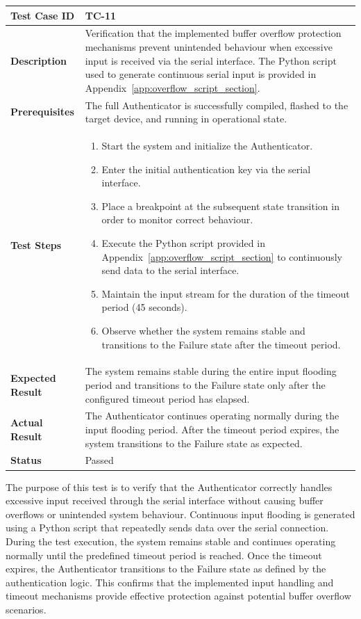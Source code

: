 \begin{table}[H]
\centering
\begin{tabular}{|p{}|p{}|}
\hline
\textbf{Test Case ID} & TC-11 \\ \hline
\textbf{Description} & Verification that the implemented buffer overflow protection mechanisms prevent unintended behaviour when excessive input is received via the serial interface. The Python script used to generate continuous serial input is provided in Appendix~\ref{app:overflow_script_section}. \\ \hline
\textbf{Prerequisites} & The full Authenticator is successfully compiled, flashed to the target device, and running in operational state. \\ \hline
\textbf{Test Steps} &
\begin{enumerate}
\item Start the system and initialize the Authenticator.
\item Enter the initial authentication key via the serial interface.
\item Place a breakpoint at the subsequent state transition in order to monitor correct behaviour.
\item Execute the Python script provided in Appendix~\ref{app:overflow_script_section} to continuously send data to the serial interface.
\item Maintain the input stream for the duration of the timeout period (45 seconds).
\item Observe whether the system remains stable and transitions to the Failure state after the timeout period.
\end{enumerate}
\\ \hline
\textbf{Expected Result} & The system remains stable during the entire input flooding period and transitions to the Failure state only after the configured timeout period has elapsed. \\ \hline
\textbf{Actual Result} & The Authenticator continues operating normally during the input flooding period. After the timeout period expires, the system transitions to the Failure state as expected. \\ \hline
\textbf{Status} & \textcolor{green!60!black}{Passed} \\ \hline
\end{tabular}
\end{table}

The purpose of this test is to verify that the Authenticator correctly handles excessive input received through the serial interface without causing buffer overflows or unintended system behaviour. Continuous input flooding is generated using a Python script that repeatedly sends data over the serial connection. During the test execution, the system remains stable and continues operating normally until the predefined timeout period is reached. Once the timeout expires, the Authenticator transitions to the Failure state as defined by the authentication logic. This confirms that the implemented input handling and timeout mechanisms provide effective protection against potential buffer overflow scenarios.

